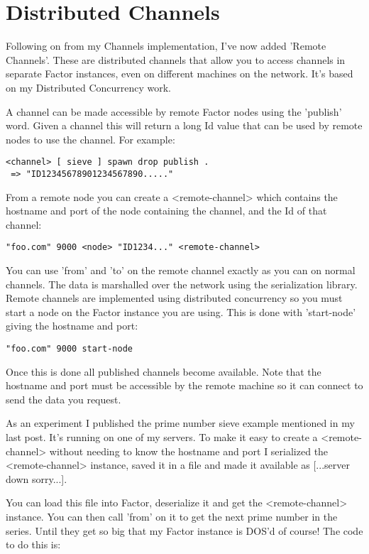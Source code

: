 \chapter{Distributed Channels}\label{dchannels}

Following on from my Channels implementation, I've now added 'Remote
Channels'. These are distributed channels that allow you to access
channels in separate Factor instances, even on different machines on
the network. It's based on my Distributed Concurrency work.

A channel can be made accessible by remote Factor nodes using the
'publish' word. Given a channel this will return a long Id value that
can be used by remote nodes to use the channel. For example:

\begin{verbatim}
<channel> [ sieve ] spawn drop publish .
 => "ID12345678901234567890....."
\end{verbatim}

From a remote node you can create a <remote-channel> which contains
 the hostname and port of the node containing the channel, and the Id
 of that channel:

\begin{verbatim}
"foo.com" 9000 <node> "ID1234..." <remote-channel>
\end{verbatim}

You can use 'from' and 'to' on the remote channel exactly as you can
 on normal channels. The data is marshalled over the network using the
 serialization library.  Remote channels are implemented using
 distributed concurrency so you must start a node on the Factor
 instance you are using. This is done with 'start-node' giving the
 hostname and port:

\begin{verbatim}
"foo.com" 9000 start-node
\end{verbatim}

Once this is done all published channels become available. Note that
the hostname and port must be accessible by the remote machine so it
can connect to send the data you request.

As an experiment I published the prime number sieve example mentioned
in my last post. It's running on one of my servers. To make it easy to
create a <remote-channel> without needing to know the hostname and
port I serialized the <remote-channel> instance, saved it in a file
and made it available as [...server down sorry...].

You can load this file into Factor, deserialize it and get the
<remote-channel> instance. You can then call 'from' on it to get the
next prime number in the series. Until they get so big that my Factor
instance is DOS'd of course! The code to do this is:


